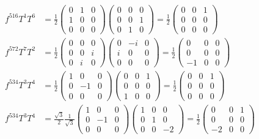\begin{align}
  f^{516}T^1T^6 &= \frac{1}{2}\begin{pmatrix}0 & 1 & 0 \\ 1 & 0 & 0 \\ 0 & 0 & 0\end{pmatrix}\begin{pmatrix}0 & 0 & 0 \\ 0 & 0 & 1 \\ 0 & 1 & 0\end{pmatrix} = \frac{1}{2}\begin{pmatrix}0 & 0 & 1 \\ 0 & 0 & 0 \\ 0 & 0 & 0\end{pmatrix} \\
  f^{572}T^7T^2 &= \frac{1}{2}\begin{pmatrix}0 & 0 & 0 \\ 0 & 0 & i \\ 0 & i & 0\end{pmatrix}\begin{pmatrix}0 & -i & 0 \\ i & 0 & 0 \\ 0 & 0 & 0\end{pmatrix} = \frac{1}{2}\begin{pmatrix}0 & 0 & 0 \\ 0 & 0 & 0 \\ -1 & 0 & 0\end{pmatrix} \\
  f^{534}T^3T^4 &= \frac{1}{2}\begin{pmatrix}1 & 0 & 0 \\ 0 & -1 & 0 \\ 0 & 0 & 0\end{pmatrix}\begin{pmatrix}0 & 0 & 1 \\ 0 & 0 & 0 \\ 1 & 0 & 0\end{pmatrix} = \frac{1}{2}\begin{pmatrix}0 & 0 & 1 \\ 0 & 0 & 0 \\ 0 & 0 & 0\end{pmatrix} \\
  f^{534}T^3T^4 &= \frac{\sqrt{3}}{2}\frac{1}{\sqrt{3}}\begin{pmatrix}1 & 0 & 0 \\ 0 & -1 & 0 \\ 0 & 0 & 0\end{pmatrix}\begin{pmatrix}1 & 0 & 0 \\ 0 & 1 & 0 \\ 0 & 0 & -2\end{pmatrix} = \frac{1}{2}\begin{pmatrix}0 & 0 & 1 \\ 0 & 0 & 0 \\ -2 & 0 & 0\end{pmatrix}
\end{align}

